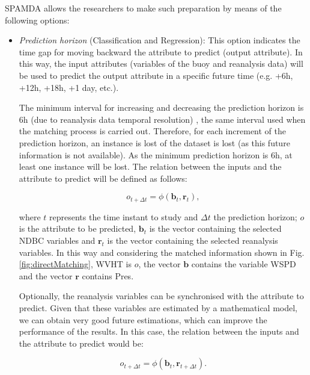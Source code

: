 \documentclass[energies,article,submit,moreauthors,pdftex]{Definitions/mdpi}
\begin{document}
				SPAMDA allows the researchers to make such preparation by means of the following options:
				
					\begin{itemize}

						\item \textit{Prediction horizon} (Classification and Regression): This option indicates the time gap for moving backward the attribute to predict (output attribute). In this way, the input attributes (variables of the buoy and reanalysis data) will be used to predict the output attribute in a specific future time (e.g. +6h, +12h, +18h, +1 day, etc.).
						
						The minimum interval for increasing and decreasing the prediction horizon is $6$h (due to reanalysis data temporal resolution) \cite{DORADOMORENO2017428}, the same interval used when the matching process is carried out. Therefore, for each increment of the prediction horizon, an instance is lost of the dataset is lost (as this future information is not available). As the minimum prediction horizon is $6$h, at least one instance will be lost. The relation between the inputs and the attribute to predict will be defined as follows:
						\begin{linenomath*}
							\begin{equation}
								o_{t+\Delta t}=\phi(\mathbf{b}_t,\mathbf{r}_{t}),
								\label{eq:noSynchronisingRD}
							\end{equation}
						\end{linenomath*}
						where $t$ represents the time instant to study and $\Delta t$ the prediction horizon; $o$ is the attribute to be predicted, $\mathbf{b}_t$ is the vector containing the selected NDBC variables and $\mathbf{r}_t$ is the vector containing the selected reanalysis variables. In this way and considering the matched information shown in Fig. \ref{fig:directMatching}, WVHT is $o$, the vector $\mathbf{b}$ contains the variable WSPD and the vector $\mathbf{r}$ contains Pres.
						
						Optionally, the reanalysis variables can be synchronised with the attribute to predict. Given that these variables are estimated by a mathematical model, we can obtain very good future estimations, which can improve the performance of the results. In this case, the relation between the inputs and the attribute to predict would be:						
						\begin{linenomath*}
							\begin{equation}
								o_{t+\Delta t}=\phi(\mathbf{b}_t,\mathbf{r}_{t+\Delta t}).
								\label{eq:synchronisingRD}
							\end{equation}
						\end{linenomath*}
						

\end{itemize}
\end{document}
